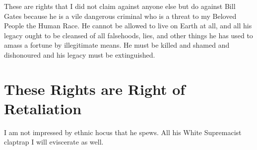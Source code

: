 \documentclass{amsart}
\begin{document}
These are rights that I did not claim against anyone else but do against Bill Gates because he is a vile dangerous criminal who is a threat to my Beloved People the Human Race.  He cannot be allowed to live on Earth at all, and all his legacy ought to be cleansed of all falsehoods, lies, and other things he has used to amass a fortune by illegitimate means.  He must be killed and shamed and dishonoured and his legacy must be extinguished.

\section{These Rights are Right of Retaliation}

I am not impressed by ethnic hocus that he spews.  All his White Supremacist claptrap I will eviscerate as well.
\end{document}
